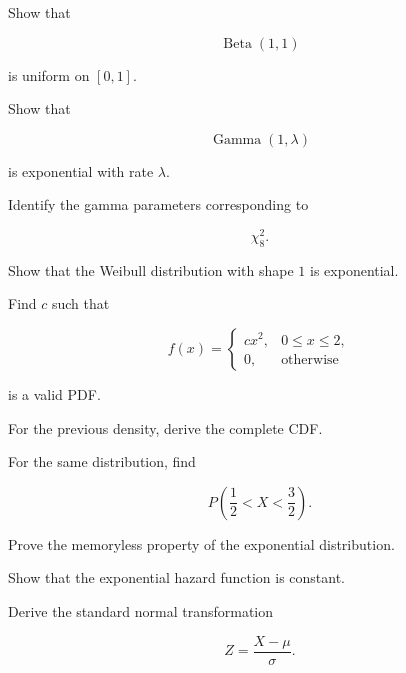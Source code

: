 \begin{exercise}[2]
Show that

\[
\operatorname{Beta}(1,1)
\]

is uniform on \([0,1]\).
\end{exercise}

\begin{exercise}[2]
Show that

\[
\operatorname{Gamma}(1,\lambda)
\]

is exponential with rate \(\lambda\).
\end{exercise}

\begin{exercise}[2]
Identify the gamma parameters corresponding to

\[
\chi^2_8.
\]
\end{exercise}

\begin{exercise}[2]
Show that the Weibull distribution with shape \(1\) is exponential.
\end{exercise}

\begin{exercise}[3]
Find \(c\) such that

\[
f(x)
=
\begin{cases}
cx^2,&0\leq x\leq2,\\
0,&\text{otherwise}
\end{cases}
\]

is a valid PDF.
\end{exercise}

\begin{exercise}[3]
For the previous density, derive the complete CDF.
\end{exercise}

\begin{exercise}[3]
For the same distribution, find

\[
P\left(
\frac12<X<\frac32
\right).
\]
\end{exercise}

\begin{exercise}[3]
Prove the memoryless property of the exponential distribution.
\end{exercise}

\begin{exercise}[3]
Show that the exponential hazard function is constant.
\end{exercise}

\begin{exercise}[3]
Derive the standard normal transformation

\[
Z=\frac{X-\mu}{\sigma}.
\]
\end{exercise}

